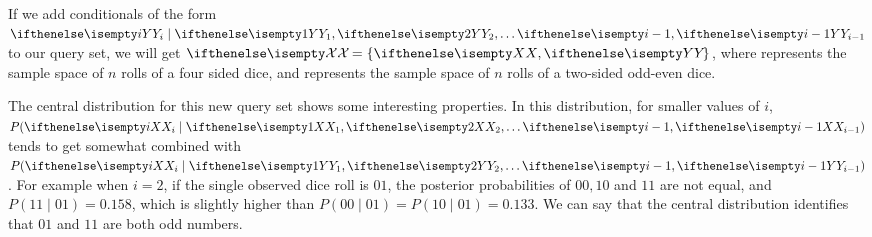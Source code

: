 If we add conditionals of the form $\YcondYseq$ to our query set, we will get
$\Qset = \{\X, \Y\}$, where \X represents the sample space of $n$ rolls of a four sided dice,
and \Y represents the sample space of $n$ rolls of a two-sided odd-even dice.

The central distribution for this new query set shows some interesting properties.
In this distribution, for smaller values of $i$, $P(\X[i] \mid \seqRv{i-1})$
tends to get somewhat combined with $P(\XcondYseq)$.
For example when $i = 2$, if the single observed dice roll is $01$, the posterior probabilities of
$00,10$ and $11$ are not equal, and $P(11 \mid 01) = 0.158$, which is slightly higher than
$P(00 \mid 01) = P(10 \mid 01) = 0.133$.
We can say that the central distribution identifies that $01$ and $11$ are both odd numbers.
